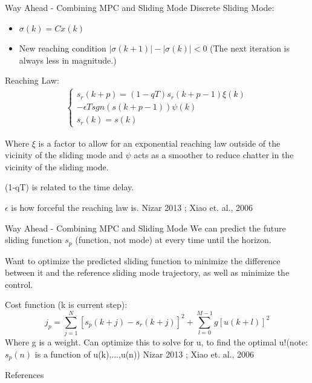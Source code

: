 \documentclass[aspectratio=169]{beamer}
\begin{document}
\begin{frame}{Way Ahead - Combining MPC and Sliding Mode}
    Discrete Sliding Mode:
    \begin{itemize}
        \item $\sigma(k)=Cx(k)$
        \item New reaching condition $|\sigma(k+1)|-|\sigma(k)|<0$ (The next iteration is always less in magnitude.)
    \end{itemize}
    Reaching Law:
    \begin{align*}
        \begin{cases}
           s_r(k+p)=(1-qT)s_r(k+p-1)\xi(k)\\
            -\epsilon Tsgn(s(k+p-1))\psi(k)\\
            s_r(k)=s(k)
        \end{cases}
    \end{align*}
    
    
    Where $\xi$ is a factor to allow for an exponential reaching law outside of the vicinity of the sliding mode and $\psi$ acts as a smoother to reduce chatter in the vicinity of the sliding mode.
    
    (1-qT) is related to the time delay.
    
    $\epsilon$ is how forceful the reaching law is.\break
    \break
    Nizar 2013 \cite{NizarMPCSMC}; Xiao et. al., 2006 \cite{XiaoMPCSMC}
\end{frame}
\begin{frame}{Way Ahead - Combining MPC and Sliding Mode}
    We can predict the future sliding function $s_p$ (function, not mode) at every time until the horizon.
    \break
    
    Want to optimize the predicted sliding function to minimize the difference between it and the reference sliding mode trajectory, as well as minimize the control.\break
    
    Cost function (k is current step):
    $$j_p=\sum\limits_{j=1}^{N}[s_p(k+j)-s_r(k+j)]^2+\sum\limits_{l=0}^{M-1}g[u(k+l)]^2$$
    Where g is a weight.\break
    Can optimize this to solve for u, to find the optimal u!\break (note: $s_p(n)$ is a function of u(k),...,u(n)) \break
    \break
    Nizar 2013 \cite{NizarMPCSMC}; Xiao et. al., 2006 \cite{XiaoMPCSMC}
\end{frame}

\begin{frame}{References}
    \nocite{*}
    \footnotesize
    
    
\end{frame}
\end{document}
